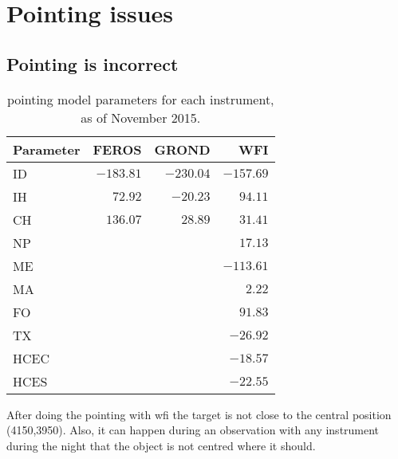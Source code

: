 \documentclass[11pt,fleqn,a4paper]{book}
\begin{document}
\section{Pointing issues}

\subsection{Pointing is incorrect}
\label{sec:trouble:pointing}
\begin{table}[!bt]
\centering
\caption[Pointing model parameters for each instrument]{\Gls{pointing model} parameters for each instrument, as of November 2015.}
\label{tab:pointingmodelcoeff}
\small
\begin{tabular}{lrrr}
\hline\hline
Parameter & FEROS      & GROND     & WFI\\\hline
ID        & $-183.81$  & $-230.04$ & $-157.69$\\
IH        & $  72.92$  & $ -20.23$ & $  94.11$\\
CH        & $ 136.07$  & $  28.89$ & $  31.41$\\\hline
NP        & \multicolumn{3}{r}{$17.13$}\\
ME        & \multicolumn{3}{r}{$-113.61$}\\
MA        & \multicolumn{3}{r}{$2.22$}\\
FO        & \multicolumn{3}{r}{$91.83$}\\
TX        & \multicolumn{3}{r}{$-26.92$}\\
HCEC      & \multicolumn{3}{r}{$-18.57$}\\
HCES      & \multicolumn{3}{r}{$-22.55$}\\\hline
\end{tabular}
\end{table}

After doing the \gls{pointing} with \gls{wfi} the target is not close to the central position (4150,3950).  Also, it can happen during an observation with any instrument during the night that the object is not centred where it should.
\end{document}
